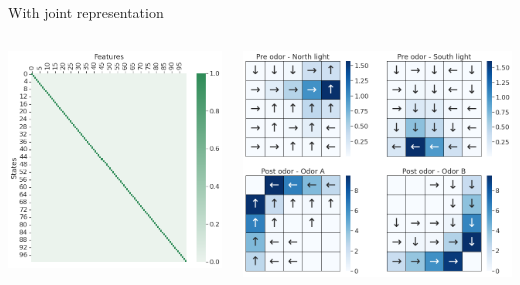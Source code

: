 \documentclass[bigger]{beamer}
\begin{document}
\begin{frame}[label={sec:orgb3bc871}]{With joint representation}
\begin{columns}
\begin{column}{0.5\columnwidth}
\begin{center}
\includegraphics[height=0.4\textheight]{img/features-allo-joint-repr.png}
\end{center}
\end{column}
\begin{column}{0.5\columnwidth}
\begin{center}
\includegraphics[width=\textwidth]{img/policy-allo-joint-repr.png}

\end{center}
\end{column}
\end{columns}
\end{frame}
\end{document}

